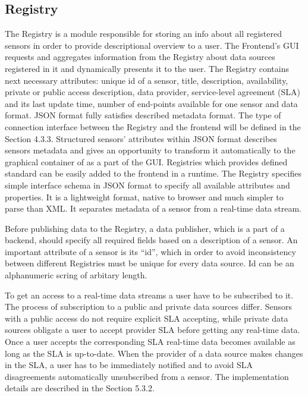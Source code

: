   \subsection{Registry}
    The Registry is a module responsible for storing an info about all registered sensors in order to provide descriptional overview to a user. The Frontend's GUI requests and aggregates information from the Registry about data sources registered in it and dynamically presents it to the user. The Registry contains next necessary attributes: unique id of a sensor, title, description, availability, private or public access description, data provider, service-level agreement (SLA) and its last update time, number of end-points available for one sensor and data format. JSON format fully satisfies described metadata format. The type of connection interface between the Registry and the frontend will be defined in the Section 4.3.3. Structured sensors' attributes within JSON format describes sensors metadata and gives an opportunity to transform it automatically to the graphical container of as a part of the GUI. Registries which provides defined standard can be easily added to the frontend in a runtime. The Registry specifies simple interface schema in JSON format to specify all available attributes and properties. It is a lightweight format, native to browser and much simpler to parse than XML. It separates metadata of a sensor from a real-time data stream. 

    Before publishing data to the Registry, a data publisher, which is a part of a backend, should specify all required fields based on a description of a sensor. An important attribute of a sensor is its ``id'', which in order to avoid inconsistency between different Registries must be unique for every data source. Id can be an alphanumeric scring of arbitary length.

    To get an access to a real-time data streams a user have to be subscribed to it. The process of subscription to a public and private data sources differ. Sensors with a public access do not require explicit SLA accepting, while private data sources obligate a user to accept provider SLA before getting any real-time data. Once a user accepts the corresponding SLA real-time data becomes available as long as the SLA is up-to-date. When the provider of a data source makes changes in the SLA, a user has to be immediately notified and to avoid SLA disagreements automatically unsubscribed from a sensor. The implementation details are described in the Section 5.3.2.

